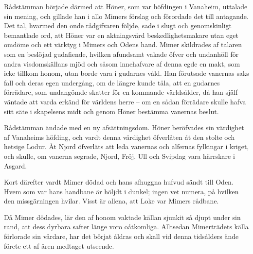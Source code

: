 Rådstämman började därmed att Höner, som var höfdingen i Vanaheim,
uttalade sin mening, och gillade han i allo Mimers förslag och förordade
det till antagande. Det tal, hvarmed den onde rådgifvaren följde, sade i
slugt och genomskinligt bemantlade ord, att Höner var en aktningsvärd
beskedlighetsmakare utan eget omdöme och ett värktyg i Mimers och Odens
hand. Mimer skildrades af talaren som en beslöjad gudafiende, hvilken
afundsamt vakade öfver och undanhöll för andra visdomskällans mjöd och
såsom innehafvare af denna egde en makt, som icke tillkom honom, utan
borde vara i gudarnes våld. Han förutsade vanernas saks fall och deras
egen undergång, om de längre kunde tåla, att en gudarnes förrädare, som
undangömde skatter för en kommande världsålder, då han själf väntade att
varda erkänd för världens herre -- om en sådan förrädare skulle hafva
sitt säte i skapelsens midt och genom Höner bestämma vanernas beslut.

Rådstämman ändade med en ny afsättningsdom. Höner beröfvades sin
värdighet af Vanaheims höfding, och vardt denna värdighet öfverlåten åt
den stolte och hetsige Lodur. Åt Njord öfverläts att leda vanernas och
alfernas fylkingar
i kriget, och skulle, om vanerna segrade, Njord, Fröj, Ull och Svipdag
vara härrskare i Asgard.

Kort därefter vardt Mimer dödad och hans afhuggna hufvud sändt till
Oden. Hvem som var hans handbane är höljdt i dunkel; ingen vet numera,
på hvilken den missgärningen hvilar. Visst är allena, att Loke var
Mimers rådbane.

Då Mimer dödades, lär den af honom vaktade källan sjunkit så djupt under
sin rand, att dess dyrbara safter länge voro oåtkomliga. Alltsedan
Mimerträdets källa förlorade sin vårdare, har det börjat åldras och
skall vid denna tidsålders ände förete ett af åren medtaget utseende.

